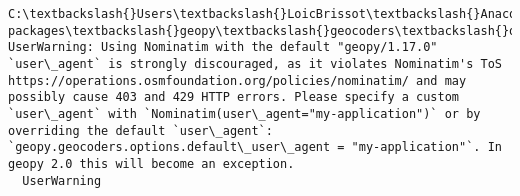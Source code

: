 \documentclass[11pt]{article}
\begin{document}
    \begin{Verbatim}[commandchars=\\\{\}]
C:\textbackslash{}Users\textbackslash{}LoicBrissot\textbackslash{}Anaconda3\textbackslash{}lib\textbackslash{}site-packages\textbackslash{}geopy\textbackslash{}geocoders\textbackslash{}osm.py:143: UserWarning: Using Nominatim with the default "geopy/1.17.0" `user\_agent` is strongly discouraged, as it violates Nominatim's ToS https://operations.osmfoundation.org/policies/nominatim/ and may possibly cause 403 and 429 HTTP errors. Please specify a custom `user\_agent` with `Nominatim(user\_agent="my-application")` or by overriding the default `user\_agent`: `geopy.geocoders.options.default\_user\_agent = "my-application"`. In geopy 2.0 this will become an exception.
  UserWarning

    \end{Verbatim}
\end{document}
